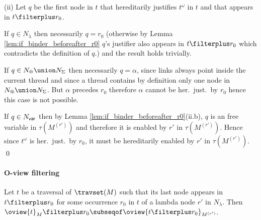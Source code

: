 (ii)
Let $q$ be the first node in $t$ that hereditarily justifies
$t^\omega$ in $t$ and that appears in $t\filterplus r_0$.


If $q \in N_\lambda$ then necessarily $q = r_0$
(otherwise by Lemma \ref{lem:if_binder_beforeafter_r0}
$q$'s justifier also appears in $t\filterplus r_0$ which contradicts
the definition of $q$.) and the result holds trivially.

If $q\in N_@\union N_\Sigma$ then necessarily $q=\alpha$, since
links always point inside the current thread and since a thread contains by definition only one node in $N_@\union N_\Sigma$. But $\alpha$ precedes $r_0$ therefore $\alpha$ cannot be her.\ just.\ by $r_0$ hence this case is not possible.

If $q \in N_{\sf var}$ then by Lemma \ref{lem:if_binder_beforeafter_r0}(ii.b),
$q$ is an free variable in $\tau(M^{(r')})$ and therefore
it is enabled by $r'$ in $\tau(M^{(r')})$. Hence since $t^\omega$ is her.\ just.\ by $r_0$, it must be hereditarily enabled
by $r'$ in $\tau(M^{(r')})$. \qed

\paragraph{O-view filtering}

\begin{proposition}
\label{prop:oview_trav_filtering}
   Let $t$ be a traversal of $\travset(M)$ such that its last node
   appears in $t \filterplus r_0$ for some occurrence $r_0$ in $t$ of a lambda node $r'$ in $N_\lambda$.
   Then $ \oview{t}_M\filterplus r_0 \subseqof \oview{t\filterplus r_0}_{M^{(r')}}$.
\end{proposition}

